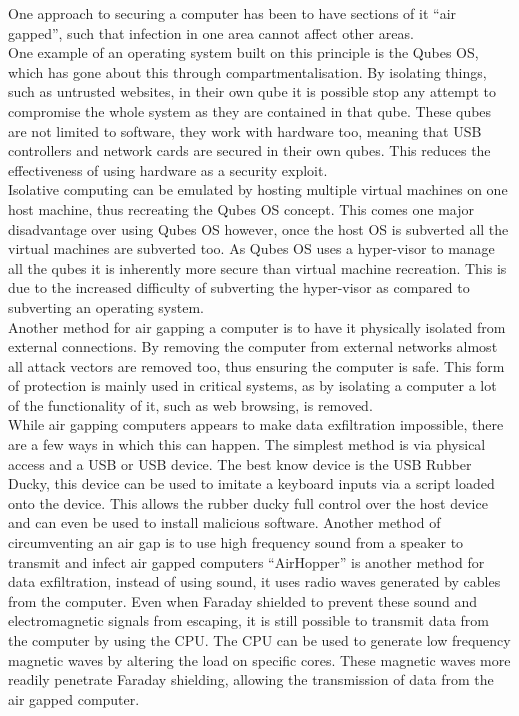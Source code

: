 \label{Ch2 Sec3}

One approach to securing a computer has been to have sections of it “air gapped”, such that infection in one area cannot affect other areas.\cite{Reference19}\\

One example of an operating system built on this principle is the Qubes OS, which has gone about this through compartmentalisation.
By isolating things, such as untrusted websites, in their own qube it is possible stop any attempt to compromise the whole system as they are contained in that qube.
These qubes are not limited to software, they work with hardware too, meaning that USB controllers and network cards are secured in their own qubes.
This reduces the effectiveness of using hardware as a security exploit.\cite{Reference20}\\

Isolative computing can be emulated by hosting multiple virtual machines on one host machine, thus recreating the Qubes OS concept.
This comes one major disadvantage over using Qubes OS however, once the host OS is subverted all the virtual machines are subverted too.\cite{Reference21}
As Qubes OS uses a hyper-visor to manage all the qubes it is inherently more secure than virtual machine recreation.
This is due to the increased difficulty of subverting the hyper-visor as compared to subverting an operating system.\\

Another method for air gapping a computer is to have it physically isolated from external connections.
By removing the computer from external networks almost all attack vectors are removed too, thus ensuring the computer is safe.
This form of protection is mainly used in critical systems, as by isolating a computer a lot of the functionality of it, such as web browsing, is removed.\cite{Reference22}\\

While air gapping computers appears to make data exfiltration impossible, there are a few ways in which this can happen.
The simplest method is via physical access and a USB or USB device.
The best know device is the USB Rubber Ducky, this device can be used to imitate a keyboard inputs via a script loaded onto the device.\cite{Reference23}
This allows the rubber ducky full control over the host device and can even be used to install malicious software.\cite{Reference23}
Another method of circumventing an air gap is to use high frequency sound from a speaker to transmit and infect air gapped computers\cite{Reference24} “AirHopper” is another method for data exfiltration, instead of using sound, it uses radio waves generated by cables from the computer.\cite{Reference25}
Even when Faraday shielded to prevent these sound and electromagnetic signals from escaping, it is still possible to transmit data from the computer by using the CPU.
The CPU can be used to generate low frequency magnetic waves by altering the load on specific cores.
These magnetic waves more readily penetrate Faraday shielding, allowing the transmission of data from the air gapped computer.\cite{Reference26}

